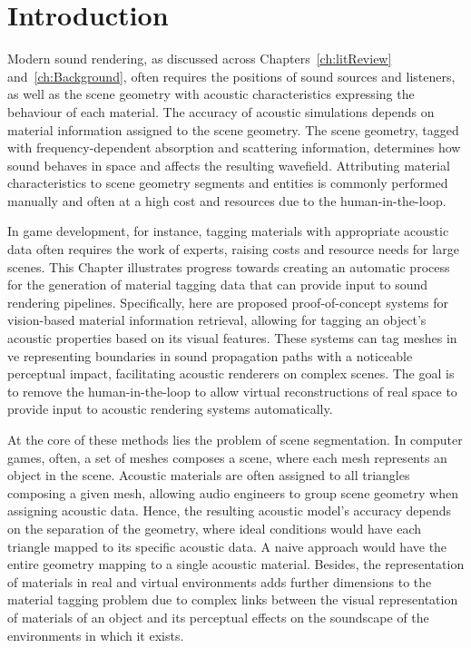 \section{Introduction}
Modern sound rendering, as discussed across Chapters~\ref{ch:litReview} and~\ref{ch:Background}, often requires the positions of sound sources and listeners, as well as the scene geometry with acoustic characteristics expressing the behaviour of each material. The accuracy of acoustic simulations depends on material information assigned to the scene geometry. The scene geometry, tagged with frequency-dependent absorption and scattering information, determines how sound behaves in space and affects the resulting wavefield. Attributing material characteristics to scene geometry segments and entities is commonly performed manually and often at a high cost and resources due to the human-in-the-loop.\par
In game development, for instance, tagging materials with appropriate acoustic data often requires the work of experts, raising costs and resource needs for large scenes. This Chapter illustrates progress towards creating an automatic process for the generation of material tagging data that can provide input to sound rendering pipelines. Specifically, here are proposed proof-of-concept systems for vision-based material information retrieval, allowing for tagging an object's acoustic properties based on its visual features. These systems can tag meshes in \acrshort{ve} representing boundaries in sound propagation paths with a noticeable perceptual impact, facilitating acoustic renderers on complex scenes. The goal is to remove the human-in-the-loop to allow virtual reconstructions of real space to provide input to acoustic rendering systems automatically.\par
At the core of these methods lies the problem of scene segmentation. In computer games, often, a set of meshes composes a scene, where each mesh represents an object in the scene. Acoustic materials are often assigned to all triangles composing a given mesh, allowing audio engineers to group scene geometry when assigning acoustic data. Hence, the resulting acoustic model's accuracy depends on the separation of the geometry, where ideal conditions would have each triangle mapped to its specific acoustic data. A naive approach would have the entire geometry mapping to a single acoustic material. Besides, the representation of materials in real and virtual environments adds further dimensions to the material tagging problem due to complex links between the visual representation of materials of an object and its perceptual effects on the soundscape of the environments in which it exists.\par
